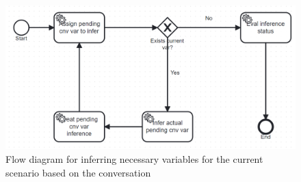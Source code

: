 \documentclass[a4paper,12pt,twoside]{ThesisStyle}
\begin{document}
\begin{figure}[H]
  \centering
  \includegraphics[width=1\textwidth]{img/Infere_conversation_variables.bpmn20.png}
  \caption{Flow diagram for inferring necessary variables for the current scenario based on the conversation}
  \label{fig:infervariablesprocess}
\end{figure}
\end{document}
